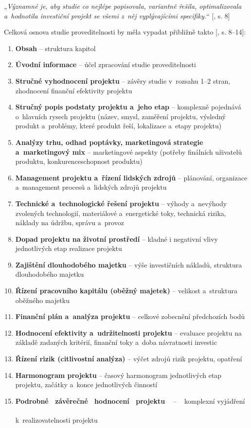 \documentclass[
	11pt, oneside, printed, final, palatino
	microtype,
	table,   %
	lof,     %
	lot     %
]{fithesis3}
\makeatletter
\newcommand{\citepages}[2]{[\cite{#2}, s. #1]}
\newcommand{\bold}[1]{\textbf{#1}}
\newcommand{\citace}[1]{„\textit{#1}“} %
\newcommand{\mezera}{\bigskip}
\makeatother
\begin{document}
{\mezera

\citace{Významné je, aby studie co nejlépe popisovala, variantně řešila, optimalizovala a~hodnotila investiční projekt se všemi z~něj vyplývajícími specifiky.} \citepages{8}{Sieber2004} 

\mezera

Celková osnova studie proveditelnosti by měla vypadat přibližně takto \citepages{8–14}{Sieber2004}:
\mezera
\begin{enumerate}
\item \bold{Obsah} – struktura kapitol
\item \bold{Úvodní informace} – účel zpracování studie proveditelnosti
\item \bold{Stručné vyhodnocení projektu} – závěry studie v~rozsahu 1–2 stran, zhodnocení finanční efektivity projektu
\item \bold{Stručný popis podstaty projektu a~jeho etap} – komplexně pojednává o~hlavních rysech projektu (název, smysl, zaměření projektu, výsledný produkt a~problémy, které produkt řeší, lokalizace a~etapy projektu)
\item \bold{Analýzy trhu, odhad poptávky, marketingová strategie a~marketingový mix} – marketingové aspekty (potřeby finálních uživatelů produktu, konkurenceschopnost produktu)
\item \bold{Management projektu a~řízení lidských zdrojů} – plánování, organizace a~management procesů a~lidských zdrojů projektu 
\item \bold{Technické a~technologické řešení projektu} – výhody a~nevýhody zvolených technologií, materiálové a~energetické toky, technická rizika, náklady na údržbu, správu a~provoz
\item \bold{Dopad projektu na životní prostředí} – kladné i negativní vlivy jednotlivých etap realizace projektu
\item \bold{Zajištění dlouhodobého majetku} – výše investičních nákladů, struktura dlouhodobého majetku
\item \bold{Řízení pracovního kapitálu (oběžný majetek)} – velikost a~struktura oběžného majetku
\item \bold{Finanční plán a~analýza projektu} – celkové zobecnění předchozích bodů
\item \bold{Hodnocení efektivity a~udržitelnosti projektu} – evaluace projektu na základě zadaných kritérií, finanční toky a~doba návratnosti investic
\item \bold{Řízení rizik (citlivostní analýza)} – výčet zdrojů rizik projektu, opatření
\item \bold{Harmonogram projektu} – časový harmonogram jednotlivých etap projektu, začátky a~konce jednotlivých činností
\item \bold{Podrobné ~závěrečné ~hodnocení ~projektu} ~ – ~ komplexní vyjádření ~\\k~realizovatelnosti projektu
\end{enumerate}

}
\end{document}
